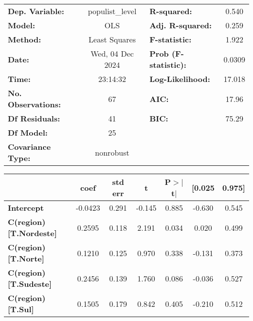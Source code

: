 \begin{center}
\begin{tabular}{lclc}
\toprule
\textbf{Dep. Variable:}            & populist\_level  & \textbf{  R-squared:         } &     0.540   \\
\textbf{Model:}                    &       OLS        & \textbf{  Adj. R-squared:    } &     0.259   \\
\textbf{Method:}                   &  Least Squares   & \textbf{  F-statistic:       } &     1.922   \\
\textbf{Date:}                     & Wed, 04 Dec 2024 & \textbf{  Prob (F-statistic):} &   0.0309    \\
\textbf{Time:}                     &     23:14:32     & \textbf{  Log-Likelihood:    } &    17.018   \\
\textbf{No. Observations:}         &          67      & \textbf{  AIC:               } &     17.96   \\
\textbf{Df Residuals:}             &          41      & \textbf{  BIC:               } &     75.29   \\
\textbf{Df Model:}                 &          25      & \textbf{                     } &             \\
\textbf{Covariance Type:}          &    nonrobust     & \textbf{                     } &             \\
\bottomrule
\end{tabular}
\begin{tabular}{lcccccc}
                                   & \textbf{coef} & \textbf{std err} & \textbf{t} & \textbf{P$> |$t$|$} & \textbf{[0.025} & \textbf{0.975]}  \\
\midrule
\textbf{Intercept}                 &      -0.0423  &        0.291     &    -0.145  &         0.885        &       -0.630    &        0.545     \\
\textbf{C(region)[T.Nordeste]}     &       0.2595  &        0.118     &     2.191  &         0.034        &        0.020    &        0.499     \\
\textbf{C(region)[T.Norte]}        &       0.1210  &        0.125     &     0.970  &         0.338        &       -0.131    &        0.373     \\
\textbf{C(region)[T.Sudeste]}      &       0.2456  &        0.139     &     1.760  &         0.086        &       -0.036    &        0.527     \\
\textbf{C(region)[T.Sul]}          &       0.1505  &        0.179     &     0.842  &         0.405        &       -0.210    &        0.512     \\

\end{tabular}
\end{center}
